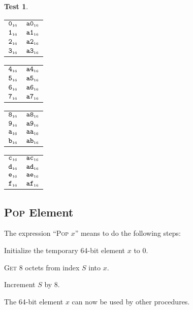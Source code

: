 \documentclass[a4paper,12pt]{article}
\makeatletter
\newcommand{\num}[1]{\texttt{\MakeLowercase{#1}}}
\newcommand{\hex}[1]{\num{#1}_{\textup{\tiny 16}}}
\newcommand{\MEM}[1]{\ifthenelse{\equal{#1}{}}{M}{M[#1]}}
\newcommand{\SP}{S}
\newcommand{\proc}[1]{\textsc{#1}}
\theoremstyle{definition}
\newtheorem{test}{Test}
\newenvironment{memtable}{%
  \begin{trivlist}
    \item
    }{%
    \end{trivlist}}
\newenvironment{memcolumn}{%
  \begin{tabular}{@{}ll@{}}
    \hline}
    {%
    \hline
  \end{tabular}}
\newcommand{\memspace}{\qquad}
\makeatother
\begin{document}
\begin{test}
  \begin{memtable}
    \begin{memcolumn}
      $\hex{0}$ & $\hex{A0}$ \\
      $\hex{1}$ & $\hex{A1}$ \\
      $\hex{2}$ & $\hex{A2}$ \\
      $\hex{3}$ & $\hex{A3}$ \\
    \end{memcolumn}
    \memspace
    \begin{memcolumn}
      $\hex{4}$ & $\hex{A4}$ \\
      $\hex{5}$ & $\hex{A5}$ \\
      $\hex{6}$ & $\hex{A6}$ \\
      $\hex{7}$ & $\hex{A7}$ \\
    \end{memcolumn}
    \memspace
    \begin{memcolumn}
      $\hex{8}$ & $\hex{A8}$ \\
      $\hex{9}$ & $\hex{A9}$ \\
      $\hex{A}$ & $\hex{AA}$ \\
      $\hex{B}$ & $\hex{AB}$ \\
    \end{memcolumn}
    \memspace
    \begin{memcolumn}
      $\hex{C}$ & $\hex{AC}$ \\
      $\hex{D}$ & $\hex{AD}$ \\
      $\hex{E}$ & $\hex{AE}$ \\
      $\hex{F}$ & $\hex{AF}$ \\
    \end{memcolumn}
  \end{memtable}
\end{test}

\subsection{\proc{Pop} Element}

The expression ``\proc{Pop} $x$'' means to do the following steps:
\begin{stepnumbers}
\item Initialize the temporary 64-bit element $x$ to 0.
\item \proc{Get} 8 octets from index $\SP$ into $x$.
\item Increment $\SP$ by 8.
\end{stepnumbers}
The 64-bit element $x$ can now be used by other procedures.
\end{document}
